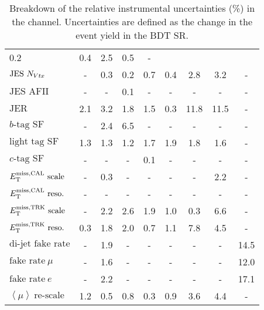\begin{table}[p!]
\begin{center}
{\begin{tabular}{l || c c | c c c c c c }
0.2 & 0.4 & 2.5 & 0.5 & - \\
$\textrm{JES}~N_{Vtx}$ & - & 0.3 & 0.2 & 0.7 & 0.4 & 2.8 & 3.2 & - \\
$\textrm{JES AFII}$ & - & - & 0.1 & - & - & - & - & - \\
$\textrm{JER}$ & 2.1 & 3.2 & 1.8 & 1.5 & 0.3 & 11.8 & 11.5 & - \\
$b\textrm{-tag SF}$ & - & 2.4 & 6.5 & - & - & - & - & - \\
$\textrm{light tag SF}$ & 1.3 & 1.3 & 1.2 & 1.7 & 1.9 & 1.8 & 1.6 & -
\\
$c\textrm{-tag SF}$ & - & - & - & 0.1 & - & - & - & - \\
$E_{\mathrm{T}}^{\rm miss, CAL}~\textrm{scale}$ & - & 0.3 & - & - & - & - & 2.2 & - \\
$E_{\mathrm{T}}^{\rm miss, CAL}~\textrm{reso.}$ & - & - & - & - & - & - & - & - \\
$E_{\rm T}^{\rm miss, TRK}~\textrm{scale}$ & - & 2.2 & 2.6 & 1.9 & 1.0 & 0.3 & 6.6 & -
\\
$E_{\rm T}^{\rm miss, TRK}~\textrm{reso.}$ & 0.3 & 1.8 & 2.0 & 0.7 & 1.1 & 7.8 & 4.5 & -
\\
$\textrm{di-jet fake rate}$ & - & 1.9 & - & - & - & - & - & 14.5 \\
$\textrm{fake rate}~\mu$ & - & 1.6 & - & - & - & - & - & 12.0 \\
$\textrm{fake rate}~e$ & - & 2.2 & - & - & - & - & - & 17.1 \\
$\left \langle \mu \right \rangle~\textrm{re-scale}$ & 1.2 & 0.5 & 0.8
& 0.3 & 0.9 & 3.6 & 4.4 & - \\
\hline
\end{tabular}
}
\caption[Instrumental uncertainty summary in the \emme
  channel.]{Breakdown of the relative instrumental uncertainties (\%) in the \emme
  channel. Uncertainties are defined as the change in the event yield in the BDT SR.}
\label{chap:analysis:tab:exp_sys_df}
\end{center}
\end{table}
